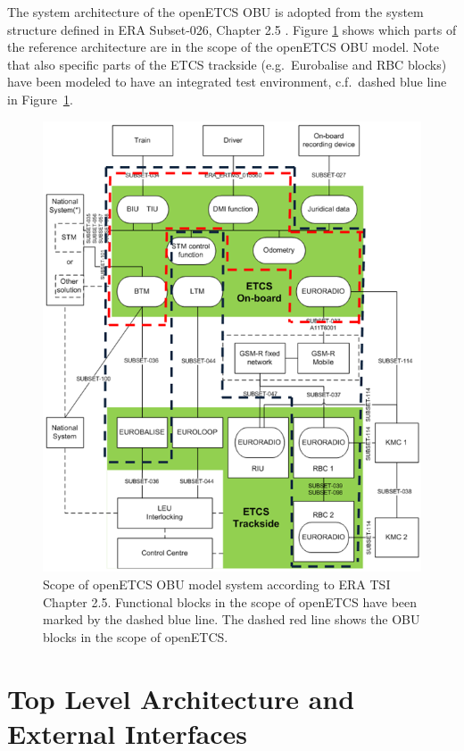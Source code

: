 
The system architecture of the openETCS OBU is adopted from the system structure defined in ERA Subset-026, Chapter 2.5 \cite{subset-026}. Figure \ref{f:architecture_srs} shows which parts of the reference architecture are in the scope of the openETCS OBU model. Note that also specific parts of the ETCS trackside (e.g.~Eurobalise and RBC blocks) have been modeled to have an integrated test environment, c.f.~dashed blue line in Figure~\ref{f:architecture_srs}.

\begin{figure}
\centering
\includegraphics[width=.7\textwidth]{images/ArchitectureSRS}
\caption[Scope of openETCS OBU model system according to ERA TSI Chapter 2.5.]{Scope of openETCS OBU model system according to ERA TSI Chapter 2.5. Functional blocks in the scope of openETCS have been marked by the dashed blue line. The dashed red line shows the OBU blocks in the scope of openETCS.}
\label{f:architecture_srs}
\end{figure}


\section{Top Level Architecture and External Interfaces}

